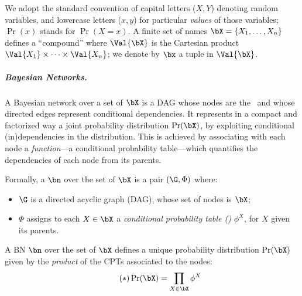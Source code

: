 We adopt the standard convention of capital letters (\eg $X,Y$) denoting random variables, and lowercase letters (\eg $x,y$) for particular \emph{values} of those variables; $\Pr(x)$ stands for $\Pr(X=x)$.
A finite set of names $\bX=\{X_1, \dots, X_n\}$ defines a ``compound'' \rv where $\Val{\bX}$ is the Cartesian product $\Val{X_1} \times \dots \times \Val{X_n}$; we denote by $\bx$ a tuple in $\Val{\bX}$.

%

\subparagraph{Bayesian Networks.}

A Bayesian network over a set of \rvs $\bX$ is a DAG whose nodes are the \rvs\ and whose directed edges represent conditional dependencies.
It represents in a compact and factorized way a joint probability distribution $\Pr(\bX)$, by exploiting conditional (in)dependencies in the distribution.
This is achieved by associating with each node a \emph{function}---a conditional probability table---which quantifies the dependencies of each node from its parents.

Formally, a  $\bn$ over the set of \rvs $\bX$ is a pair $(\G,\Phi)$ where:
\begin{itemize}
\item $\G$ is a directed acyclic graph (DAG), whose set of nodes is $\bX$;
\item $\Phi$ assigns to each $X\in\bX$ a \emph{conditional probability table (\cpt)} $\phi^X$, for $X$ given its parents.
\end{itemize}

\begin{theorem}
\label{lem:BNsem}
A BN $\bn$ over the set of \rvs $\bX$ defines a unique probability distribution $\Pr(\bX)$ given by the \emph{product} of the CPTs associated to the nodes:
\begin{equation}
\label{eq:BNsem}
\tag{$\ast$}
\Pr(\bX) = \prod_{X\in \bX} \phi^X
\end{equation}
\end{theorem}

